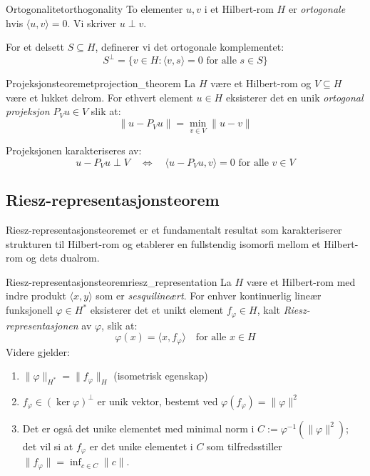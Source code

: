 \begin{definition}{Ortogonalitet}{orthogonality}
	To elementer $u, v$ i et Hilbert-rom $H$ er \emph{ortogonale} hvis $\langle u, v \rangle = 0$. Vi skriver $u \perp v$.

	For et delsett $S \subseteq H$, definerer vi det ortogonale komplementet:
	\begin{equation}
		S^\perp = \{v \in H : \langle v, s \rangle = 0 \text{ for alle } s \in S\}
	\end{equation}
\end{definition}

\begin{theorem}{Projeksjonsteoremet}{projection_theorem}
	La $H$ være et Hilbert-rom og $V \subseteq H$ være et lukket delrom. For ethvert element $u \in H$ eksisterer det en unik \emph{ortogonal projeksjon} $P_V u \in V$ slik at:
	\begin{equation}
		\|u - P_V u\| = \min_{v \in V} \|u - v\|
	\end{equation}

	Projeksjonen karakteriseres av:
	\begin{equation}
		u - P_V u \perp V \quad \Leftrightarrow \quad \langle u - P_V u, v \rangle = 0 \text{ for alle } v \in V
	\end{equation}
\end{theorem}

\subsection{Riesz-representasjonsteorem}
Riesz-representasjonsteoremet er et fundamentalt resultat som karakteriserer strukturen til Hilbert-rom og etablerer en fullstendig isomorfi mellom et Hilbert-rom og dets dualrom.
\begin{theorem}{Riesz-representasjonsteorem}{riesz_representation}
	La $H$ være et Hilbert-rom med indre produkt $\langle x, y \rangle$ som er \emph{sesquilineært}.
	For enhver kontinuerlig lineær funksjonell $\varphi \in H^\ast$ eksisterer det et unikt element $f_\varphi \in H$, kalt \emph{Riesz-representasjonen} av $\varphi$, slik at:
	\begin{equation}
		\varphi(x) = \langle x, f_\varphi \rangle \quad \text{for alle } x \in H
	\end{equation}
	Videre gjelder:
	\begin{enumerate}
		\item \(\|\varphi\|_{H^\ast} = \|f_\varphi\|_H\) (isometrisk egenskap)
		\item \(f_\varphi \in (\ker \varphi)^\perp\) er unik vektor, bestemt ved \(\varphi(f_\varphi) = \|\varphi\|^2\)
		\item Det er også det unike elementet med minimal norm i \( C := \varphi^{-1}(\|\varphi\|^2) \); det vil si at \( f_\varphi \) er det unike elementet i \( C \) som tilfredsstiller \( \|f_\varphi\| = \inf_{c \in C} \|c\| \).
	\end{enumerate}
\end{theorem}

